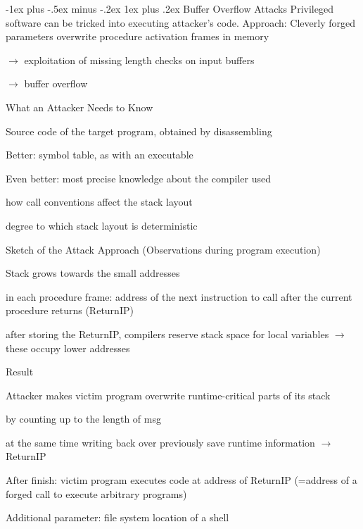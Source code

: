 \documentclass[a4paper]{article}
\makeatletter
\renewcommand{\subsubsection}{\@startsection{subsubsection}{3}{0mm}%
                                {-1ex plus -.5ex minus -.2ex}%
                                {1ex plus .2ex}%
                                {\normalfont\small\bfseries}}
\makeatother
\begin{document}
\begin{multicols}{3}
    \subsubsection{Buffer Overflow Attacks}
    Privileged software can be tricked into executing attacker’s code.
    Approach: Cleverly forged parameters overwrite procedure activation frames in memory
    \begin{itemize*}
        \item $\rightarrow$ exploitation of missing length checks on input buffers
        \item $\rightarrow$ buffer overflow
    \end{itemize*}
    What an Attacker Needs to Know
    \begin{itemize*}
        \item Source code of the target program, obtained by disassembling
        \item Better: symbol table, as with an executable
        \item Even better: most precise knowledge about the compiler used
        \begin{itemize*}
            \item how call conventions affect the stack layout
            \item degree to which stack layout is deterministic
        \end{itemize*}
    \end{itemize*}
    Sketch of the Attack Approach (Observations during program execution)
    \begin{itemize*}
        \item Stack grows towards the small addresses
        \item in each procedure frame: address of the next instruction to call after the current procedure returns (ReturnIP)
        \item after storing the ReturnIP, compilers reserve stack space for local variables $\rightarrow$ these occupy lower addresses
    \end{itemize*}
    Result
    \begin{itemize*}
        \item Attacker makes victim program overwrite runtime-critical parts of its stack
        \begin{itemize*}
            \item by counting up to the length of msg
            \item at the same time writing back over previously save runtime information $\rightarrow$  ReturnIP
        \end{itemize*}
        \item After finish: victim program executes code at address of ReturnIP (=address of a forged call to execute arbitrary programs)
        \item Additional parameter: file system location of a shell
    \end{itemize*}


\end{multicols}
\end{document}
